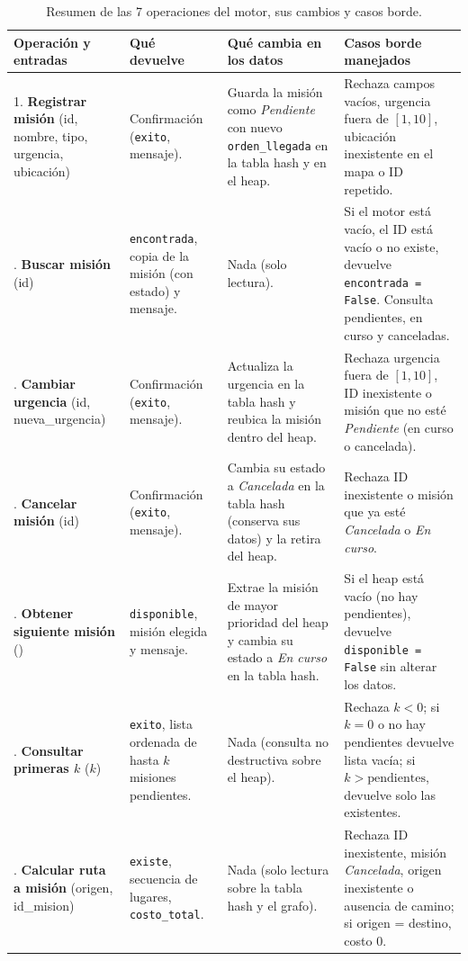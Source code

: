 \documentclass[11pt,a4paper]{article}
\begin{document}
\begin{table}[htbp]
\centering
\caption{Resumen de las 7 operaciones del motor, sus cambios y casos borde.}
\label{tab:operaciones_contrato}
\small
\begin{tabular}{p{2.7cm} p{2.7cm} p{3.4cm} p{5.2cm}}
\toprule
\textbf{Operación y entradas} & \textbf{Qué devuelve} & \textbf{Qué cambia en los datos} & \textbf{Casos borde manejados} \\
\midrule
1. \textbf{Registrar misión} (id, nombre, tipo, urgencia, ubicación) & Confirmación (\texttt{exito}, mensaje). & Guarda la misión como \textit{Pendiente} con nuevo \texttt{orden\_llegada} en la tabla hash y en el heap. & Rechaza campos vacíos, urgencia fuera de $[1,10]$, ubicación inexistente en el mapa o ID repetido. \\
\addlinespace
2. \textbf{Buscar misión} (id) & \texttt{encontrada}, copia de la misión (con estado) y mensaje. & Nada (solo lectura). & Si el motor está vacío, el ID está vacío o no existe, devuelve \texttt{encontrada = False}. Consulta pendientes, en curso y canceladas. \\
\addlinespace
3. \textbf{Cambiar urgencia} (id, nueva\_urgencia) & Confirmación (\texttt{exito}, mensaje). & Actualiza la urgencia en la tabla hash y reubica la misión dentro del heap. & Rechaza urgencia fuera de $[1,10]$, ID inexistente o misión que no esté \textit{Pendiente} (en curso o cancelada). \\
\addlinespace
4. \textbf{Cancelar misión} (id) & Confirmación (\texttt{exito}, mensaje). & Cambia su estado a \textit{Cancelada} en la tabla hash (conserva sus datos) y la retira del heap. & Rechaza ID inexistente o misión que ya esté \textit{Cancelada} o \textit{En curso}. \\
\addlinespace
5. \textbf{Obtener siguiente misión} () & \texttt{disponible}, misión elegida y mensaje. & Extrae la misión de mayor prioridad del heap y cambia su estado a \textit{En curso} en la tabla hash. & Si el heap está vacío (no hay pendientes), devuelve \texttt{disponible = False} sin alterar los datos. \\
\addlinespace
6. \textbf{Consultar primeras $k$} ($k$) & \texttt{exito}, lista ordenada de hasta $k$ misiones pendientes. & Nada (consulta no destructiva sobre el heap). & Rechaza $k < 0$; si $k = 0$ o no hay pendientes devuelve lista vacía; si $k > \text{pendientes}$, devuelve solo las existentes. \\
\addlinespace
7. \textbf{Calcular ruta a misión} (origen, id\_mision) & \texttt{existe}, secuencia de lugares, \texttt{costo\_total}. & Nada (solo lectura sobre la tabla hash y el grafo). & Rechaza ID inexistente, misión \textit{Cancelada}, origen inexistente o ausencia de camino; si origen = destino, costo $0$. \\
\bottomrule
\end{tabular}
\end{table}
\end{document}
